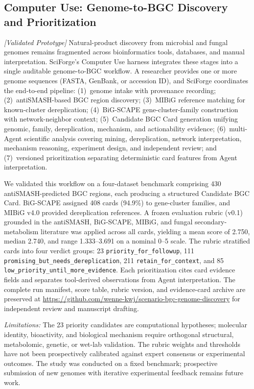 \documentclass[sn-basic,Numbered,pdflatex]{sn-jnl}
\begin{document}
\subsection{Computer Use: Genome-to-BGC Discovery and Prioritization}

\textit{[Validated Prototype]} Natural-product discovery from microbial and fungal genomes remains fragmented across bioinformatics tools, databases, and manual interpretation. SciForge's Computer Use harness integrates these stages into a single auditable genome-to-BGC workflow. A researcher provides one or more genome sequences (FASTA, GenBank, or accession ID), and SciForge coordinates the end-to-end pipeline: (1)~genome intake with provenance recording; (2)~antiSMASH-based BGC region discovery; (3)~MIBiG reference matching for known-cluster dereplication; (4)~BiG-SCAPE gene-cluster-family construction with network-neighbor context; (5)~Candidate BGC Card generation unifying genomic, family, dereplication, mechanism, and actionability evidence; (6)~multi-Agent scientific analysis covering mining, dereplication, network interpretation, mechanism reasoning, experiment design, and independent review; and (7)~versioned prioritization separating deterministic card features from Agent interpretation.

We validated this workflow on a four-dataset benchmark comprising 430 antiSMASH-predicted BGC regions, each producing a structured Candidate BGC Card. BiG-SCAPE assigned 408 cards (94.9\%) to gene-cluster families, and MIBiG v4.0 provided dereplication references. A frozen evaluation rubric (v0.1) grounded in the antiSMASH, BiG-SCAPE, MIBiG, and fungal secondary-metabolism literature was applied across all cards, yielding a mean score of 2.750, median 2.740, and range 1.333--3.691 on a nominal 0--5 scale. The rubric stratified cards into four verdict groups: 23 \texttt{priority\_for\_followup}, 111 \texttt{promising\_but\_needs\_dereplication}, 211 \texttt{retain\_for\_context}, and 85 \texttt{low\_priority\_until\_more\_evidence}. Each prioritization cites card evidence fields and separates tool-derived observations from Agent interpretation. The complete run manifest, score table, rubric version, and evidence-card archive are preserved at \url{https://github.com/wenne-kwj/scenario-bgc-genome-discovery} for independent review and manuscript drafting.

\textit{Limitations:} The 23 priority candidates are computational hypotheses; molecular identity, bioactivity, and biological mechanism require orthogonal structural, metabolomic, genetic, or wet-lab validation. The rubric weights and thresholds have not been prospectively calibrated against expert consensus or experimental outcomes. The study was conducted on a fixed benchmark; prospective submission of new genomes with iterative experimental feedback remains future work.
\end{document}
